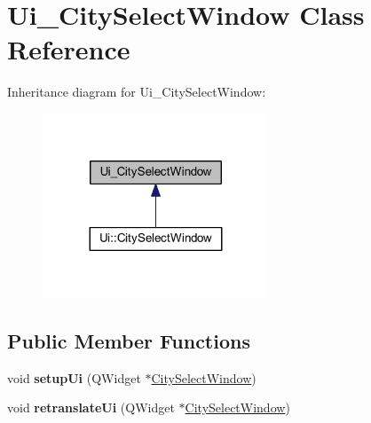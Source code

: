 \hypertarget{class_ui___city_select_window}{}\section{Ui\+\_\+\+City\+Select\+Window Class Reference}
\label{class_ui___city_select_window}


Inheritance diagram for Ui\+\_\+\+City\+Select\+Window\+:
\nopagebreak
\begin{figure}[H]
\begin{center}
\leavevmode
\includegraphics[width=191pt]{class_ui___city_select_window__inherit__graph}
\end{center}
\end{figure}
\subsection*{Public Member Functions}
\begin{DoxyCompactItemize}
\item 
\mbox{\label{class_ui___city_select_window_a0984abfece713da5e3ef219fd6b4b640}} 
void {\bfseries setup\+Ui} (Q\+Widget $\ast$\mbox{\hyperlink{class_city_select_window}{City\+Select\+Window}})
\item 
\mbox{\label{class_ui___city_select_window_ae7ea20821b449c19c09ae9ca73f03daf}} 
void {\bfseries retranslate\+Ui} (Q\+Widget $\ast$\mbox{\hyperlink{class_city_select_window}{City\+Select\+Window}})
\end{DoxyCompactItemize}
